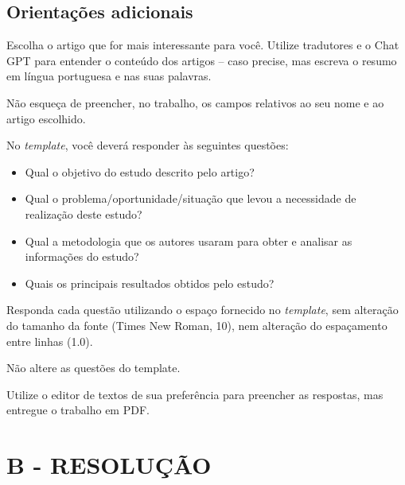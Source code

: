 \subsection{Orientações adicionais}



Escolha o artigo que for mais interessante para você. Utilize tradutores e o Chat GPT para entender o conteúdo dos
artigos – caso precise, mas escreva o resumo em língua portuguesa e nas suas palavras. 



Não esqueça de preencher, no trabalho, os campos relativos ao seu nome e ao artigo escolhido.



No \textit{template}, você deverá responder às seguintes questões:

\begin{itemize}
\item Qual o objetivo do estudo descrito pelo artigo?
\item Qual o problema/oportunidade/situação que levou a necessidade de realização deste estudo?
\item Qual a metodologia que os autores usaram para obter e analisar as informações do estudo?
\item Quais os principais resultados obtidos pelo estudo?
\end{itemize}


Responda cada questão utilizando o espaço fornecido no \textit{template}, sem alteração do tamanho da fonte (Times New
Roman, 10), nem alteração do espaçamento entre linhas (1.0).



Não altere as questões do template.



Utilize o editor de textos de sua preferência para preencher as respostas, mas entregue o trabalho em PDF.


\section*{\textbf{B - RESOLUÇÃO}}
\lipsum[30]